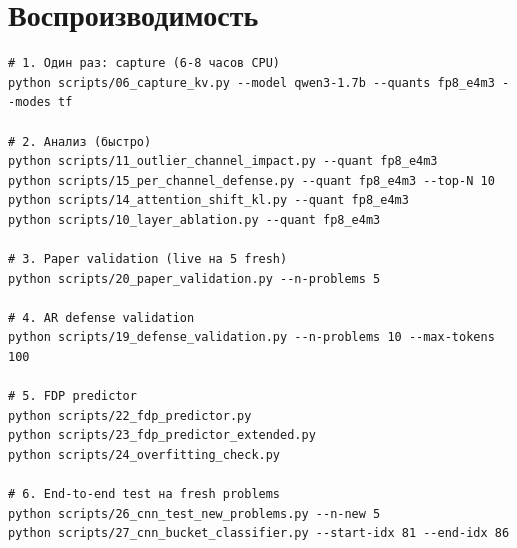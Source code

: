\documentclass[a4paper,12pt]{article}
\begin{document}
\appendix
\section{Воспроизводимость}

\begin{verbatim}
# 1. Один раз: capture (6-8 часов CPU)
python scripts/06_capture_kv.py --model qwen3-1.7b --quants fp8_e4m3 --modes tf

# 2. Анализ (быстро)
python scripts/11_outlier_channel_impact.py --quant fp8_e4m3
python scripts/15_per_channel_defense.py --quant fp8_e4m3 --top-N 10
python scripts/14_attention_shift_kl.py --quant fp8_e4m3
python scripts/10_layer_ablation.py --quant fp8_e4m3

# 3. Paper validation (live на 5 fresh)
python scripts/20_paper_validation.py --n-problems 5

# 4. AR defense validation
python scripts/19_defense_validation.py --n-problems 10 --max-tokens 100

# 5. FDP predictor
python scripts/22_fdp_predictor.py
python scripts/23_fdp_predictor_extended.py
python scripts/24_overfitting_check.py

# 6. End-to-end test на fresh problems
python scripts/26_cnn_test_new_problems.py --n-new 5
python scripts/27_cnn_bucket_classifier.py --start-idx 81 --end-idx 86
\end{verbatim}

\label{end}
\end{document}
